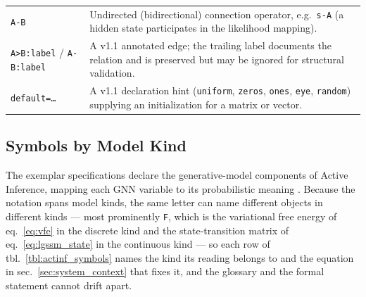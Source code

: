\documentclass[
  english,
  9pt,
]{extarticle}
\begin{document}
\begin{longtable}[]{@{}
  >{\raggedright\arraybackslash}p{}
  >{\raggedright\arraybackslash}p{}@{}}
\texttt{A-B} & Undirected (bidirectional) connection operator,
e.g.~\texttt{s-A} (a hidden state participates in the likelihood
mapping). \\
\texttt{A\textgreater{}B:label} / \texttt{A-B:label} & A v1.1 annotated
edge; the trailing label documents the relation and is preserved but may
be ignored for structural validation. \\
\texttt{default=…} & A v1.1 declaration hint (\texttt{uniform},
\texttt{zeros}, \texttt{ones}, \texttt{eye}, \texttt{random}) supplying
an initialization for a matrix or vector. \\
\end{longtable}

\subsection{Symbols by Model Kind}\label{symbols-by-model-kind}

The exemplar specifications declare the generative-model components of
Active Inference, mapping each GNN variable to its probabilistic meaning
\citep{dacosta2020, smith2022, parr2022}. Because the notation spans
model kinds, the same letter can name different objects in different
kinds --- most prominently \texttt{F}, which is the variational free
energy of eq.~\ref{eq:vfe} in the discrete kind and the state-transition
matrix of eq.~\ref{eq:lgssm_state} in the continuous kind --- so each
row of tbl.~\ref{tbl:actinf_symbols} names the kind its reading belongs
to and the equation in sec.~\ref{sec:system_context} that fixes it, and
the glossary and the formal statement cannot drift apart.
\end{document}

